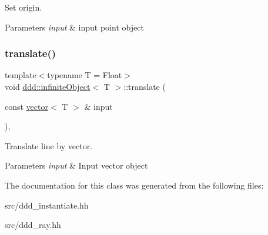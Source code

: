 Set origin. 


\begin{DoxyParams}{Parameters}
{\em input} & input point object \\
\hline
\end{DoxyParams}
\mbox{\label{classddd_1_1infinite_object_a72649daa44060efdbef986ab9d90f3f6}} 
\subsubsection{\texorpdfstring{translate()}{translate()}}
{\footnotesize\ttfamily template$<$typename T = Float$>$ \\
void \hyperlink{classddd_1_1infinite_object}{ddd\+::infinite\+Object}$<$ T $>$\+::translate (\begin{DoxyParamCaption}\item[{const \hyperlink{classddd_1_1vector}{vector}$<$ T $>$ \&}]{input }\end{DoxyParamCaption})\hspace{0.3cm}{\ttfamily [inline]}, {\ttfamily [inherited]}}



Translate line by vector. 


\begin{DoxyParams}{Parameters}
{\em input} & Input vector object \\
\hline
\end{DoxyParams}


The documentation for this class was generated from the following files\+:\begin{DoxyCompactItemize}
\item 
src/ddd\+\_\+instantiate.\+hh\item 
src/ddd\+\_\+ray.\+hh\end{DoxyCompactItemize}
